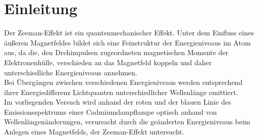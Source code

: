 \section{Einleitung}
\label{sec:Einleitung}
Der Zeeman-Effekt ist ein quantenmechanischer Effekt.
Unter dem Einfluss eines äußeren Magnetfeldes bildet sich eine Feinstruktur der Energieniveaus im Atom aus, da die, den Drehimpulsen zugeordneten magnetischen Momente der Elektronenhülle, verschieden an das Magnetfeld koppeln und daher unterschiedliche Energieniveaus annehmen.\\
Bei Übergängen zwischen verschiedenen Energieniveaus werden entsprechend ihrer Energiedifferenz Lichtquanten unterschiedlicher Wellenlänge emittiert.\\
Im vorliegenden Versuch wird anhand der roten und der blauen Linie des Emissionsspektrums einer Cadmiumdampflampe
optisch anhand von Wellenlängenänderungen, verursacht durch die geänderten Energieniveaus beim Anlegen eines Magnetfelds, der Zeeman-Effekt untersucht.
